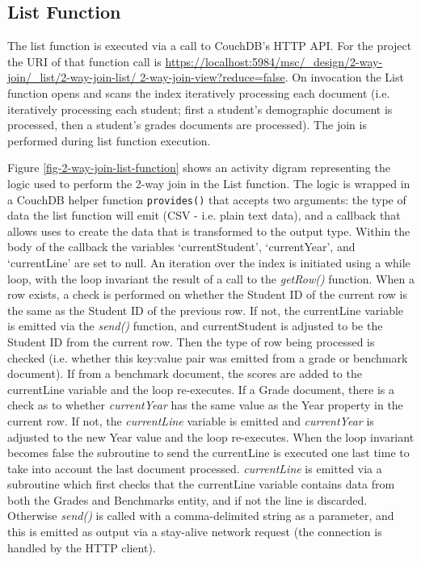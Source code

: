 

\subsection{List Function}
The list function is executed via a call to CouchDB's HTTP API. For the project the URI of that function call is \url{https://localhost:5984/msc/\_design/2-way-join/\_list/2-way-join-list/ 2-way-join-view?reduce=false}. On invocation the List function opens and scans the index iteratively processing each document (i.e. iteratively processing each student; first a student's demographic document is processed, then a student's grades documents are processed). The join is performed during list function execution.

Figure \ref{fig-2-way-join-list-function} shows an activity digram representing the logic used to perform the 2-way join in the List function. The logic is wrapped in a CouchDB helper function \texttt{provides()} that accepts two arguments: the type of data the list function will emit (CSV - i.e. plain text data), and a callback that allows uses to create the data that is transformed to the output type. Within the body of the callback the variables `currentStudent', `currentYear', and `currentLine' are set to null. An iteration over the index is initiated using a while loop, with the loop invariant the result of a call to the \textit{getRow()} function. When a row exists, a check is performed on whether the Student ID of the current row is the same as the Student ID of the previous row. If not, the currentLine variable is emitted via the \textit{send()} function, and currentStudent is adjusted to be the Student ID from the current row. Then the type of row being processed is checked (i.e. whether this key:value pair was emitted from a grade or benchmark document). If from a benchmark document, the scores are added to the currentLine variable and the loop re-executes. If a Grade document, there is a check as to whether \textit{currentYear} has the same value as the Year property in the current row. If not, the \textit{currentLine} variable is emitted and \textit{currentYear} is adjusted to the new Year value and the loop re-executes. When the loop invariant becomes false the subroutine to send the currentLine is executed one last time to take into account the last document processed. \textit{currentLine} is emitted via a subroutine which first checks that the currentLine variable contains data from both the Grades and Benchmarks entity, and if not the line is discarded. Otherwise \textit{send()} is called with a comma-delimited string as a parameter, and this is emitted as output via a stay-alive network request (the connection is handled by the HTTP client).

